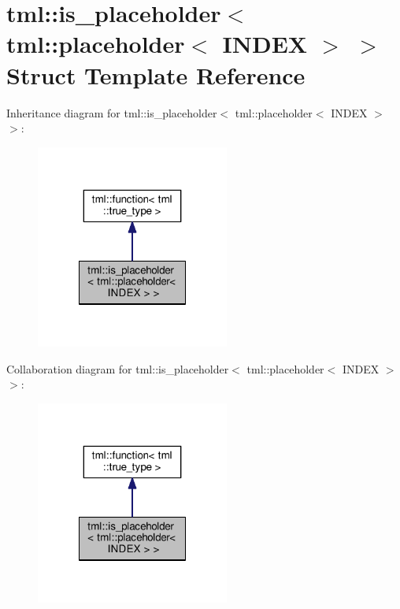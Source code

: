 \hypertarget{structtml_1_1is__placeholder_3_01tml_1_1placeholder_3_01_i_n_d_e_x_01_4_01_4}{\section{tml\+:\+:is\+\_\+placeholder$<$ tml\+:\+:placeholder$<$ I\+N\+D\+E\+X $>$ $>$ Struct Template Reference}
\label{structtml_1_1is__placeholder_3_01tml_1_1placeholder_3_01_i_n_d_e_x_01_4_01_4}
}


Inheritance diagram for tml\+:\+:is\+\_\+placeholder$<$ tml\+:\+:placeholder$<$ I\+N\+D\+E\+X $>$ $>$\+:
\nopagebreak
\begin{figure}[H]
\begin{center}
\leavevmode
\includegraphics[width=180pt]{structtml_1_1is__placeholder_3_01tml_1_1placeholder_3_01_i_n_d_e_x_01_4_01_4__inherit__graph}
\end{center}
\end{figure}


Collaboration diagram for tml\+:\+:is\+\_\+placeholder$<$ tml\+:\+:placeholder$<$ I\+N\+D\+E\+X $>$ $>$\+:
\nopagebreak
\begin{figure}[H]
\begin{center}
\leavevmode
\includegraphics[width=180pt]{structtml_1_1is__placeholder_3_01tml_1_1placeholder_3_01_i_n_d_e_x_01_4_01_4__coll__graph}
\end{center}
\end{figure}
